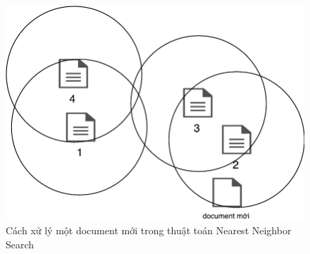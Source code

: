		\begin{figure}[H]
			\begin{center}
				\includegraphics[width=0.9\linewidth]{NNS.pdf}
				\caption{Cách xử lý một document mới trong thuật toán Nearest Neighbor Search}
			\end{center}
		\end{figure}
		
